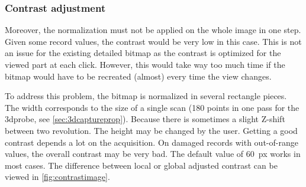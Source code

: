 \subsubsection{Contrast adjustment}
\label{sec:contrastadj}

Moreover, the normalization must not be applied on the whole image in one step. Given some record values, the contrast would be very low in this case. This is not an issue for the existing detailed bitmap as the contrast is optimized for the viewed part at each click. However, this would take way too much time if the bitmap would have to be recreated (almost) every time the view changes.

To address this problem, the bitmap is normalized in several rectangle pieces. The width corresponds to the size of a single scan (180 points in one pass for the \gls{3dprobe}, see \autoref{sec:3dcaptureprop}). Because there is sometimes a slight Z-shift between two revolution. The height may be changed by the user. Getting a good contrast depends a lot on the acquisition. On damaged records with out-of-range values, the overall contrast may be very bad. The default value of \SI{60}{px} works in most cases. The difference between local or global adjusted contrast can be viewed in \autoref{fig:contrastimage}.

